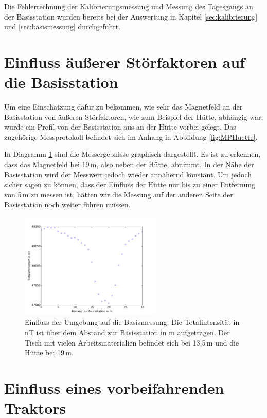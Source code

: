Die Fehlerrechnung der Kalibrierungsmessung und Messung des Tagesgangs an der Basisstation wurden bereits bei der Auswertung in Kapitel \ref{sec:kalibrierung} und \ref{sec:basismessung} durchgeführt.

\section{Einfluss äußerer Störfaktoren auf die Basisstation}

Um eine Einschätzung dafür zu bekommen, wie sehr das Magnetfeld an der Basisstation von äußeren Störfaktoren, wie zum Beispiel der Hütte, abhängig war, wurde ein Profil von der Basisstation aus an der Hütte vorbei gelegt. Das zugehörige Messprotokoll befindet sich im Anhang in Abbildung \ref{fig:MPHuette}.

In Diagramm \ref{fig:plot_huette} sind die Messergebnisse graphisch dargestellt. Es ist zu erkennen, dass das Magnetfeld bei 19\,m, also neben der Hütte, abnimmt. In der Nähe der Basisstation wird der Messwert jedoch wieder annähernd konstant. Um jedoch sicher sagen zu können, dass der Einfluss der Hütte nur bis zu einer Entfernung von 5\,m zu messen ist, hätten wir die Messung auf der anderen Seite der Basisstation noch weiter führen müssen.

\begin{figure}[!ht]
 \centering
 \includegraphics[width=0.6\textwidth]{fig/plot_huette.pdf}
 \caption[Einfluss der Umgebung auf die Basismessung]{Einfluss der Umgebung auf die Basismessung. Die Totalintensität in nT ist über dem Abstand zur Basisstation in m aufgetragen. Der Tisch mit vielen Arbeitsmaterialien befindet sich bei 13,5\,m und die Hütte bei 19\,m.}
 \label{fig:plot_huette}
\end{figure}

\section{Einfluss eines vorbeifahrenden Traktors}

